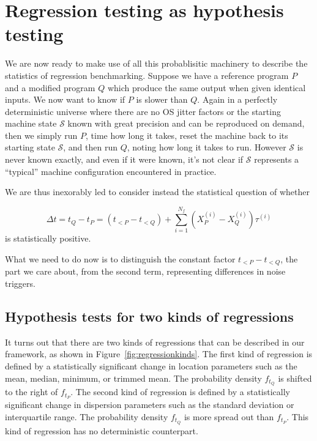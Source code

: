 \documentclass[conference]{IEEEtran}
\begin{document}
\section{Regression testing as hypothesis testing}

We are now ready to make use of all this probablisitic machinery to describe the statistics of regression benchmarking. Suppose we have a reference program $P$ and a modified program $Q$ which produce the same output when given identical inputs. We now want to know if $P$ is slower than $Q$. Again in a perfectly deterministic universe where there are no OS jitter factors or the starting machine state $\mathcal S$ known with great precision and can be reproduced on demand, then we simply run $P$, time how long it takes, reset the machine back to its starting state $\mathcal S$, and then run $Q$, noting how long it takes to run. However $\mathcal S$ is never known exactly, and even if it were known, it's not clear if
$\mathcal S$ represents a ``typical'' machine configuration encountered in practice.

We are thus inexorably led to consider instead the statistical question of whether

\begin{equation}
\Delta t = t_Q - t_P
= (t_{<P} - t_{<Q}) + \sum_{i=1}^{N_f} (X^{(i)}_P - X^{(i)}_Q) \tau^{(i)}
\end{equation}
%
is statistically positive.

What we need to do now is to distinguish the constant factor $t_{<P} - t_{<Q}$, the part we care about, from the second term, representing differences in noise triggers.


\subsection{Hypothesis tests for two kinds of regressions}

It turns out that there are two kinds of regressions that can be described in our framework, as shown in Figure~\ref{fig:regressionkinds}. The first kind of regression is defined by a statistically significant change in location parameters such as the mean, median, minimum, or trimmed mean. The probability density $f_{t_Q}$ is shifted to the right of $f_{t_P}$. The second kind of regression is defined by a statistically significant change in dispersion parameters such as the standard deviation or interquartile range. The probability density $f_{t_Q}$ is more spread out than $f_{t_P}$. This kind of regression has no deterministic counterpart.
\end{document}
